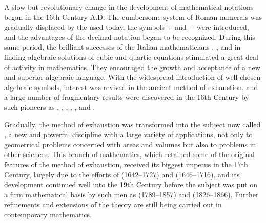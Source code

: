 \begin{note}
  A slow but revolutionary change in the development of mathematical notations began in the 16th Century A.D.
  The cumbersome system of Roman numerals was gradually displaced by the  used today, the symbols \(+\) and \(-\) were introduced, and the advantages of the decimal notation began to be recognized.
  During this same period, the brilliant successes of the Italian mathematicians \href{https://en.wikipedia.org/wiki/Nicolo_Tartaglia}{}, \href{https://en.wikipedia.org/wiki/Gerolamo_Cardano}{}, and \href{https://en.wikipedia.org/wiki/Lodovico_Ferrari}{} in finding algebraic solutions of cubic and quartic equations stimulated a great deal of activity in mathematics.
  They encouraged the growth and acceptance of a new and superior algebraic language.
  With the widespread introduction of well-chosen algebraic symbols, interest was revived in the ancient method of exhaustion, and a large number of fragmentary results were discovered in the 16th Century by such pioneers as \href{https://en.wikipedia.org/wiki/Bonaventura_Cavalieri}{}, \href{https://en.wikipedia.org/wiki/Evangelista_Torricelli}{}, \href{https://en.wikipedia.org/wiki/Gilles_de_Roberval}{}, \href{https://en.wikipedia.org/wiki/Pierre_de_Fermat}{}, \href{https://en.wikipedia.org/wiki/Blaise_Pascal}{}, and \href{https://en.wikipedia.org/wiki/John_Wallis}{}.

  Gradually, the method of exhaustion was transformed into the subject now called , a new and powerful discipline with a large variety of applications, not only to geometrical problems concerned with areas and volumes but also to problems in other sciences.
  This branch of mathematics, which retained some of the original features of the method of exhaustion, received its biggest impetus in the 17th Century, largely due to the efforts of \href{https://en.wikipedia.org/wiki/Isaac_Newton}{} (1642--1727) and \href{https://en.wikipedia.org/wiki/Gottfried_Wilhelm_Leibniz}{} (1646--1716), and its development continued well into the 19th Century before the subject was put on a firm mathematical basis by such men as \href{https://en.wikipedia.org/wiki/Augustin-Louis_Cauchy}{} (1789--1857) and \href{https://en.wikipedia.org/wiki/Bernhard_Riemann}{} (1826--1866).
  Further refinements and extensions of the theory are still being carried out in contemporary mathematics.
\end{note}
